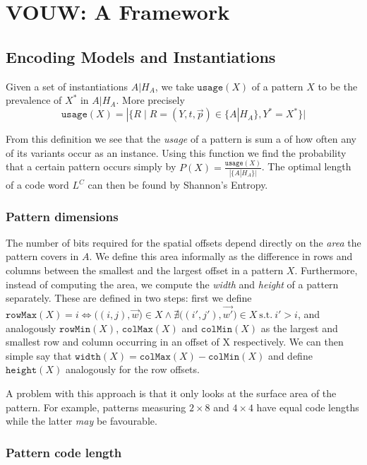 \documentclass{llncs}
\begin{document}
\section{VOUW: A Framework}
\subsection{Encoding Models and Instantiations}

\begin{definition}
Given a set of instantiations $A|H_A$, we take $\mathtt{usage}(X)$ of a pattern $X$ to be the prevalence of $X^*$ in $A|H_A$. More precisely 
$$\mathtt{usage}(X) = |\{R\mid R=(Y,t,\vec{p}) \in \{A|H_A\}, Y^*=X^*\}|$$
\end{definition}

From this definition we see that the \emph{usage} of a pattern is sum a of how often any of its variants occur as an instance. Using this function we find the probability that a certain pattern occurs simply by $P(X)=\frac{\mathtt{usage}(X)}{|\{A|H_A\}|}$. The optimal length of a code word $L^C$ can then be found by Shannon's Entropy. 

\subsubsection{Pattern dimensions}
The number of bits required for the spatial offsets depend directly on the \emph{area} the pattern covers in $A$. We define this area informally as the difference in rows and columns between the smallest and the largest offset in a pattern $X$. Furthermore, instead of computing the area, we compute the \emph{width} and \emph{height} of a pattern separately. These are defined in two steps: first we define $\mathtt{rowMax}(X) = i \iff \big((i,j),\vec{w}\big) \in X \land \nexists \big((i',j'),\vec{w'}\big) \in X \ \mathrm{s.t.} \ i'>i$, and analogously $\mathtt{rowMin}(X)$, $\mathtt{colMax}(X)$ and $\mathtt{colMin}(X)$ as the largest and smallest row and column occurring in an offset of X respectively. We can then simple say that $\mathtt{width}(X) = \mathtt{colMax}(X) - \mathtt{colMin}(X)$ and define $\mathtt{height}(X)$ analogously for the row offsets. 

A problem with this approach is that it only looks at the surface area of the pattern. For example, patterns measuring $2 \times 8$ and $4 \times 4$ have equal code lengths while the latter \emph{may} be favourable.

\subsubsection{Pattern code length}
\end{document}

